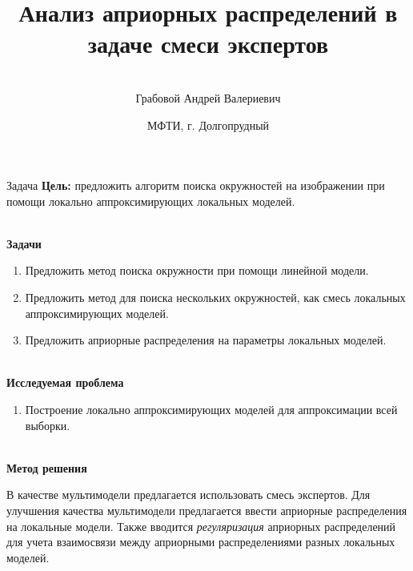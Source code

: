\documentclass[9pt,pdf,hyperref={unicode}]{beamer}
\title[\hbox to 56mm{Смеси экспертов \hfill\insertframenumber\,/\,\inserttotalframenumber}]
{Анализ априорных распределений в задаче смеси экспертов}
\author[А.\,В.~Грабовой]{\large \\Грабовой Андрей Валериевич}
\institute{\large
Московский физико-технический институт}
\date{\footnotesize{МФТИ, г. Долгопрудный}}
\begin{document}
\begin{frame}
\titlepage
\end{frame}

\begin{frame}{Задача}
\justifying
\textbf{Цель:} предложить алгоритм поиска окружностей на изображении при помощи локально аппроксимирующих локальных моделей.

~\\
\textbf{Задачи}

\begin{enumerate}
\justifying
	\item Предложить метод поиска окружности при помощи линейной модели.
	\item Предложить метод для поиска нескольких окружностей, как смесь локальных аппроксимирующих моделей.
	\item Предложить априорные распределения на параметры локальных моделей.
\end{enumerate}

~\\
\textbf{Исследуемая проблема}
\begin{enumerate}
\justifying
	\item Построение локально аппроксимирующих моделей для аппроксимации всей выборки.
\end{enumerate}

~\\
\textbf{Метод решения}

	В качестве мультимодели предлагается использовать смесь экспертов. Для улучшения качества мультимодели предлагается ввести априорные распределения на локальные модели. Также вводится \textit{регуляризация} априорных распределений для учета взаимосвязи между априорными распределениями разных локальных моделей.
	
\end{frame}
\end{document}
